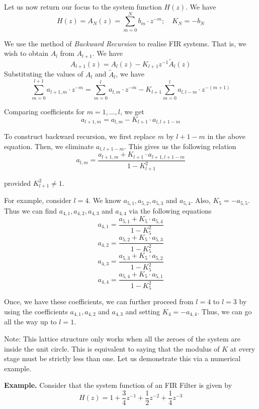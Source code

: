 \documentclass{article}
\theoremstyle{definition}
\begin{document}
Let us now return our focus to the system function $H(z)$. We have 
\[
    H(z) = A_N(z) = \sum_{m=0}^{N} b_m \cdot z^{-m} ; \quad K_N = - b_N
\]

We use the method of \textit{Backward Recursion} to realise FIR systems. That is, we wish to obtain $A_l$ from $A_{l+1}$. We have 
\[
   A_{l+1}(z) = A_l(z) - K_{l+1} z^{-1} \widetilde{A}_{l}(z)
\]
Substituting the values of $A_l$ and $\widetilde{A}_{l}$, we have 
\[
    \sum_{m=0}^{l+1} a_{l+1,m} \cdot z^{-m} = \sum_{m=0}^{l} a_{l,m} \cdot z^{-m} - K_{l+1} \sum_{m=0}^{l} a_{l,l-m} \cdot z^{-(m+1)}
\]

Comparing coefficients for $m = 1, \ldots , l$, we get
\[
    a_{l+1,m} = a_{l,m} - K_{l+1} \cdot a_{l,l+1-m}
\]  

To construct backward recursion, we first replace $m$ by $l+1-m$ in the above equation. Then, we eliminate $a_{l,l+1-m}$. This gives us the following relation
\[
    \boxed{a_{l,m} = \frac{a_{l+1,m} + K_{l+1} \cdot a_{l+1, l+1-m}}{1 - K_{l+1}^2}}
\]

provided $K_{l+1}^2 \neq 1$. \medskip

For example, consider $l=4$. We know $a_{5,1} , a_{5,2} , a_{5,3}$ and $a_{5,4}$. Also, $K_5 = - a_{5,5}$. Thus we can find $a_{4,1}, a_{4,2} , a_{4,3}$ and $a_{4,4}$ via the following equations
\[
    a_{4,1} = \frac{a_{5,1} + K_5 \cdot a_{5,4}}{1 - K_5^2}
\]
\[
    a_{4,2} = \frac{a_{5,2} + K_5 \cdot a_{5,3}}{1 - K_5^2}
\]
\[
    a_{4,3} = \frac{a_{5,3} + K_5 \cdot a_{5,2}}{1 - K_5^2}
\]
\[
    a_{4,4} = \frac{a_{5,4} + K_5 \cdot a_{5,1}}{1 - K_5^2}
\]

Once, we have these coefficients, we can further proceed from $l=4$ to $l=3$ by using the coefficients $a_{4,1}, a_{4,2}$ and $a_{4,3}$ and setting $K_4 = - a_{4,4}$. Thus, we can go all the way up to $l=1$. \medskip

Note: This lattice structure only works when all the zeroes of the system are inside the unit circle. This is equivalent to saying that the modulus of $K$ at every stage must be strictly less than one. Let us demonstrate this via a numerical example. \medskip

\textbf{Example.} Consider that the system function of an FIR Filter is given by 
\[
    H(z) = 1 + \frac{3}{4}z^{-1} +\frac{1}{2}z^{-2} + \frac{1}{4} z^{-3}
\]
\end{document}
